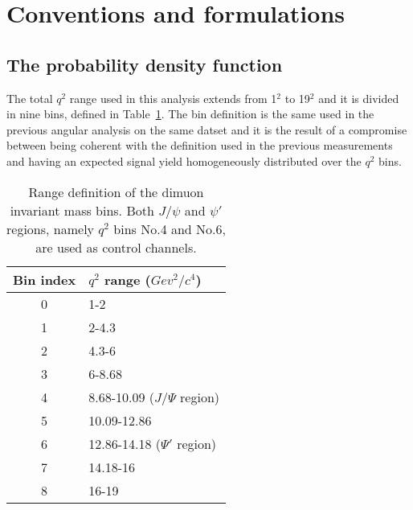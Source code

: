 \section{Conventions and formulations}
\label{sec:formula}

\subsection{The probability density function}
\label{sec:TotalPDF}


The total $q^2$ range used in this analysis extends from 1\GeV$^2$ to 19\GeV$^2$ and it is divided in nine bins, defined in Table~\ref{tab:q2bins}.
The bin definition is the same used in the previous angular analysis on the same datset and it is the result of a compromise between being coherent with the definition used in the previous measurements and having an expected signal yield homogeneously distributed over the $q^2$ bins.

\begin{table}[!htb]
  \begin{center}
    \begin{small}
      \caption{Range definition of the dimuon invariant mass bins. Both $J/\psi$ and $\psi'$ regions, namely $q^2$ bins No.4 and No.6, are used as control channels.
        \label{tab:q2bins}}
      \begin{tabular}{c|l}
        Bin index & $q^2$ range ($Gev^2/c^4$) \\
        \hline
        0 & 1-2  \\
        1 & 2-4.3  \\
        2 & 4.3-6  \\
        3 & 6-8.68   \\
        4 & 8.68-10.09 ($J/\Psi$ region) \\
        5 & 10.09-12.86\\
        6 & 12.86-14.18 ($\Psi'$ region)\\
        7 & 14.18-16\\
        8 & 16-19\\
      \end{tabular}
    \end{small}
  \end{center}
\end{table}

